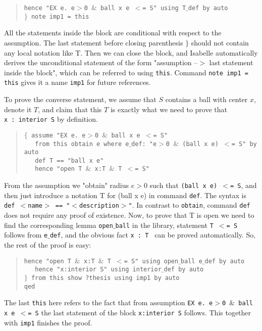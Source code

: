 \documentclass[11pt]{article}
\newcommand{\ind}{\phantom{a}\quad}
\newcommand{\inds}{\phantom{a}\,\,\,}
\newcommand{\prog}[1]{\par\noindent\begin{quote}#1\end{quote}\par\noindent}
\begin{document}
\prog{\tt \ind hence "EX e. e$>$0 $\&$ ball x e $<$= S" using T$\_$def by auto \\
    $\}$ note imp1 = this }%

All the statements inside the block are conditional with respect to the assumption. The last statement before closing parenthesis $\}$ should not contain any local notation like T. Then we can close the block, and Isabelle automatically derives the unconditional statement of the form "assumption --$>$ last statement inside the block", which can be referred to using {\tt this}. Command {\tt note imp1 = this} gives it a name {\tt imp1} for future references.

To prove the converse statement, we assume that $S$ contains a ball with center $x$, denote it $T$, and claim that this $T$ is exactly what we need to prove that {\tt x~:~interior~S} by definition.

\prog{\tt $\{$ assume "EX e. e$>$0 $\&$ ball x e $<$= S"\\
    \inds from this obtain e where e$\_$def: "e$>$0 $\&$ (ball x e) $<$= S" by auto\\
    \inds def T == "ball x e"\\
    \inds hence "open T $\&$ x:T $\&$ T $<$= S"}%

From the assumption we "obtain" radius $e>0$ such that {\tt (ball x e) $<$= S}, and then just introduce a notation T for (ball x e) in command {\tt def}. The syntax is {\tt def $<$name$>$ == "$<$description$>$"}. In contrast to {\tt obtain}, command {\tt def} does not require any proof of existence. Now, to prove that T is open we need to find the corresponding lemma {\tt open$\_$ball} in the library, statement {\tt T $<$= S} follows from {\tt e$\_$def}, and the obvious fact {\tt x~:~T~} can be proved automatically. So, the rest of the proof is easy:

\prog{\tt \ind hence "open T $\&$ x:T $\&$ T $<$= S" using open$\_$ball e$\_$def by auto\\
    \inds hence "x:interior S" using interior$\_$def by auto\\
    $\}$ from this show ?thesis using imp1 by auto\\
    qed}%

The last {\tt this} here refers to the fact that from assumption {\tt EX e. e$>$0 $\&$ ball x e $<$= S} the last statement of the block {\tt x:interior S} follows. This together with {\tt imp1} finishes the proof.
\end{document}
